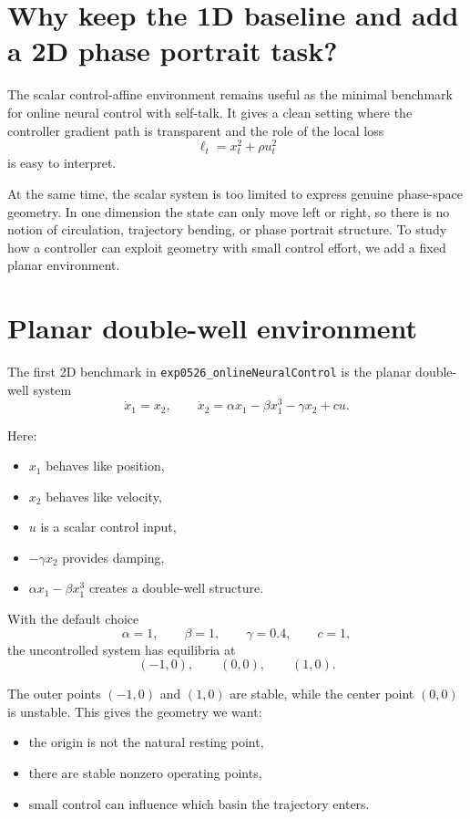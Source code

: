 \section{Why keep the 1D baseline and add a 2D phase portrait task?}

The scalar control-affine environment remains useful as the minimal benchmark for online neural control with self-talk. It gives a clean setting where the controller gradient path is transparent and the role of the local loss
\[
\ell_t = x_t^2 + \rho u_t^2
\]
is easy to interpret.

At the same time, the scalar system is too limited to express genuine phase-space geometry. In one dimension the state can only move left or right, so there is no notion of circulation, trajectory bending, or phase portrait structure. To study how a controller can exploit geometry with small control effort, we add a fixed planar environment.

\section{Planar double-well environment}

The first 2D benchmark in \texttt{exp0526\_onlineNeuralControl} is the planar double-well system
\[
\dot x_1 = x_2,\qquad
\dot x_2 = \alpha x_1 - \beta x_1^3 - \gamma x_2 + c u.
\]

Here:
\begin{itemize}
    \item $x_1$ behaves like position,
    \item $x_2$ behaves like velocity,
    \item $u$ is a scalar control input,
    \item $-\gamma x_2$ provides damping,
    \item $\alpha x_1 - \beta x_1^3$ creates a double-well structure.
\end{itemize}

With the default choice
\[
\alpha = 1,\qquad \beta = 1,\qquad \gamma = 0.4,\qquad c = 1,
\]
the uncontrolled system has equilibria at
\[
(-1,0),\qquad (0,0),\qquad (1,0).
\]

The outer points $(-1,0)$ and $(1,0)$ are stable, while the center point $(0,0)$ is unstable. This gives the geometry we want:
\begin{itemize}
    \item the origin is not the natural resting point,
    \item there are stable nonzero operating points,
    \item small control can influence which basin the trajectory enters.
\end{itemize}

